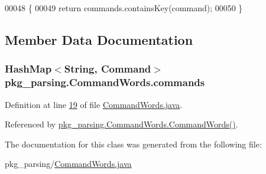 \begin{DoxyCode}
00048                                              \{
00049         \textcolor{keywordflow}{return} commands.containsKey(command);
00050     \}
\end{DoxyCode}


\subsection{Member Data Documentation}
\hypertarget{classpkg__parsing_1_1CommandWords_a82467831861a15539131a50c22e826fc}{
\subsubsection[{commands}]{\setlength{\rightskip}{0pt plus 5cm}Hash\-Map$<$String, {\bf Command}$>$ pkg\-\_\-parsing.\-Command\-Words.\-commands\hspace{0.3cm}{\ttfamily [private]}}}\label{classpkg__parsing_1_1CommandWords_a82467831861a15539131a50c22e826fc}


Definition at line \hyperlink{CommandWords_8java_source_l00019}{19} of file \hyperlink{CommandWords_8java_source}{Command\-Words.\-java}.



Referenced by \hyperlink{CommandWords_8java_source_l00024}{pkg\-\_\-parsing.\-Command\-Words.\-Command\-Words()}.



The documentation for this class was generated from the following file\-:\begin{DoxyCompactItemize}
\item 
pkg\-\_\-parsing/\hyperlink{CommandWords_8java}{Command\-Words.\-java}\end{DoxyCompactItemize}
